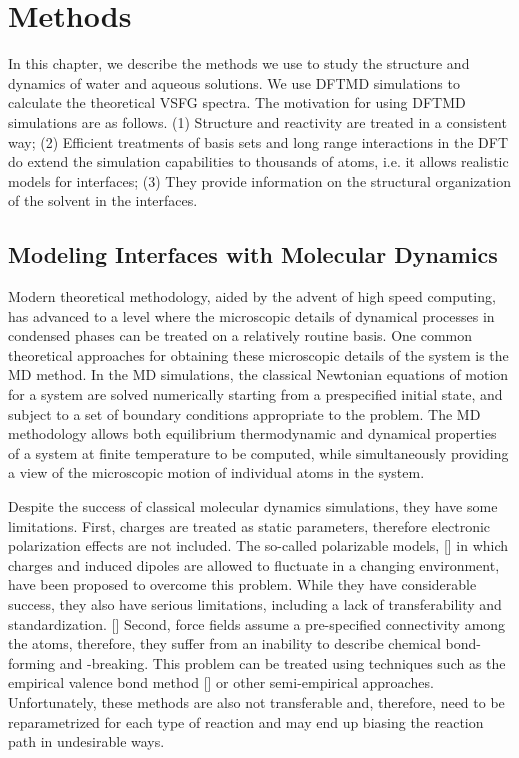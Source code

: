 \raggedbottom
\chapter{Methods}\label{CHAPTER_Methods}
In this chapter, we describe the methods we use to study the structure and dynamics of water and aqueous solutions.
We use DFTMD simulations to calculate the theoretical VSFG spectra. 
The motivation for using DFTMD simulations are as follows.
(1) Structure and reactivity are treated in a consistent way;
(2) Efficient treatments of basis sets and long range interactions in the DFT do extend the simulation capabilities to 
thousands of atoms, i.e. it allows realistic models for interfaces;
(3) They provide information on the structural organization of the solvent in the interfaces.

\section{Modeling Interfaces with \abinitio Molecular Dynamics}\label{section_AIMD}
Modern theoretical methodology, aided by the advent of high speed computing, has advanced
to a level where the microscopic details of dynamical processes in condensed phases can be
treated on a relatively routine basis. One common theoretical approaches
for obtaining these microscopic details of the system is the MD method.
In the MD simulations,  the classical Newtonian equations of motion for
a system are solved numerically starting from a prespecified initial state, and subject to a set of
boundary conditions appropriate to the problem. The MD methodology allows both equilibrium
thermodynamic and dynamical properties of a system at finite temperature to be computed,
while simultaneously providing a view of the microscopic motion of individual atoms
in the system. \cite{Tuckerman2010}

Despite the success of classical molecular dynamics simulations, they  have some limitations. First, charges
are treated as static parameters, therefore electronic polarization effects are
not included.  The so-called polarizable models, [\cite{Rick94,SWR02,Lamoureux03}] in which charges 
and induced dipoles are allowed to fluctuate in a changing environment, 
have been proposed to overcome this problem. 
While they have considerable success, they also have serious limitations, including a lack of transferability 
and standardization. [\cite{TME02}] Second, force fields assume a pre-specified connectivity among the atoms, therefore, they suffer
from an inability to describe chemical bond-forming and -breaking. This problem
can be treated using techniques such as the empirical valence
bond method [\cite{AW80}] or other semi-empirical approaches. Unfortunately, these methods are also not
transferable and, therefore, need to be reparametrized for each type of reaction and may end
up biasing the reaction path in undesirable ways.

